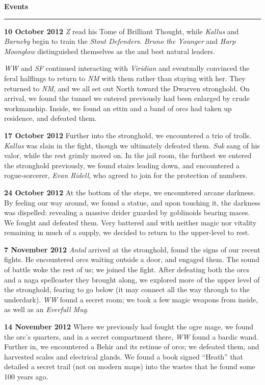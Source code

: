 \documentclass[letterpaper]{article}
\newcommand{\e}[1]{\emph{#1}}
\newcommand{\B}[1]{\textbf{#1}}
\newenvironment{notesection}[1]
{ {\huge \B{#1}}\hrule\vspace{0.5em}\begingroup\fontsize{9pt}{12pt}\selectfont}
{\endgroup}
\begin{document}
\begin{notesection}{Events}
\B{10 October 2012} \e{Z} read his Tome of Brilliant Thought, while \e{Kallus} and \e{Barneby} begin to train the \e{Stout Defenders}. \e{Bruno the Younger} and \e{Harp Moonglow} distinguished themselves as the and best natural leaders.

\e{WW} and \e{SF} continued interacting with \e{Viridian} and eventually convinced the feral halflings to return to \e{NM} with them rather than staying with her. They returned to \e{NM}, and we all set out North toward the Dwarven stronghold. On arrival, we found the tunnel we entered previously had been enlarged by crude workmanship. Inside, we found an ettin and a band of orcs had taken up residence, and defeated them. 

\B{17 October 2012} Further into the stronghold, we encountered a trio of trolls.  \e{Kallus} was slain in the fight, though we ultimately defeated them. \e{Suk} sang of his valor, while the rest grimly moved on. In the jail room, the furthest we entered the stronghold previously, we found stairs leading down, and encountered a rogue-sorcerer, \e{Evan Ridell}, who agreed to join for the protection of numbers.

\B{24 October 2012} At the bottom of the steps, we encountered arcane darkness. By feeling our way around, we found a statue, and upon touching it, the darkness was dispelled: revealing a massive drider guarded by goblinoids bearing maces. We fought and defeated them. Very battered and with neither magic nor vitality remaining in much of a supply, we decided to return to the upper-level to rest.

\B{7 November 2012} \e{Antal} arrived at the stronghold, found the signs of our recent fights. He encountered orcs waiting outside a door, and engaged them. The sound of battle woke the rest of us; we joined the fight. After defeating both the orcs and a naga spellcaster they brought along, we explored more of the upper level of the stronghold, fearing to go below (it may connect all the way through to the underdark). \e{WW} found a secret room; we took a few magic weapons from inside, as well as an \e{Everfull Mug}. 

\B{14 November 2012} Where we previously had fought the ogre mage, we found the orc's quarters, and in a secret compartment there, \e{WW} found a bardic wand. Further in, we encountered a Behir and its retinue of orcs; we defeated them, and harvested scales and electrical glands.  We found a book signed ``Heath'' that detailed a secret trail (not on modern maps) into the wastes that he found some 100 years ago.


\end{notesection}
\end{document}
